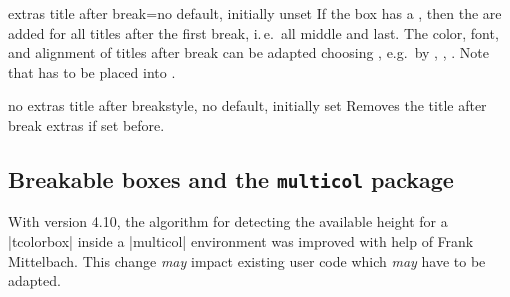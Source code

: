 \begin{docTcbKey}[][doc new=2018-07-26]{extras title after break}{=}{no default, initially unset}
  If the box has a , then the 
  are added for all titles after the first break, i.\,e.\ all middle and last.
  The color, font, and alignment of titles after break can be adapted choosing
  , e.g.\ by , ,
  .
  Note that  has to be placed into
  .
\end{docTcbKey}

\begin{docTcbKey}[][doc new=2018-07-26]{no extras title after break}{}{style, no default, initially set}
  Removes the title after break extras if set before.
\end{docTcbKey}

\bigskip





\clearpage
\subsection{Breakable boxes and the \texttt{multicol} package}\label{subsec:multicol}
\begin{marker}
With version 4.10, the algorithm for detecting the available height
for a |tcolorbox| inside a |multicol| environment was improved with help
of Frank Mittelbach. This change \emph{may} impact existing user
code which \emph{may} have to be adapted.
\end{marker}

